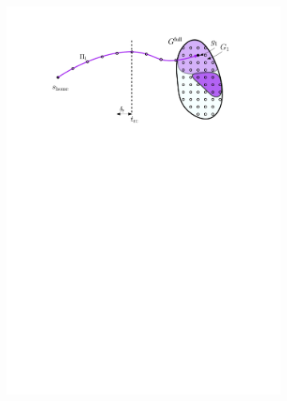 \documentclass[conference]{IEEEtran}
\begin{document}
\begin{figure}[t]
\begin{subfigure}{0.225\textwidth}
        \includegraphics[width=\textwidth]{3_preprocess_loop_2}
        \caption{}
        \label{fig:pl2}
    \end{subfigure}
    \hspace{1mm}
    \begin{subfigure}{0.225\textwidth}

\end{subfigure}
\end{figure}
\end{document}
